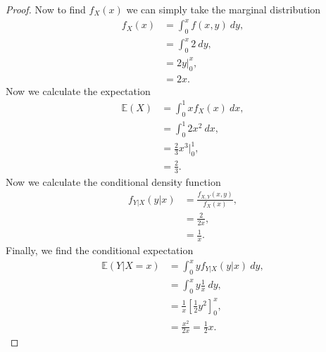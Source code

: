 \documentclass{article}
\newcommand{\E}[1]{\mathbb{E}(#1)}
\begin{document}
\begin{proof}
    Now to find $f_X(x)$ we can simply take the marginal distribution
    \begin{align*}
        f_X(x) & = \int_0^x f(x,y) \ dy, \\
               & = \int_0^x 2 \ dy,      \\
               & = 2y \big |_0^x,        \\
               & = 2x.
    \end{align*}
    Now we calculate the expectation
    \begin{align*}
        \E{X} & = \int_0^1 x f_X(x) \ dx,    \\
              & = \int_0^1 2x^2 \ dx,        \\
              & = \frac{2}{3}x^3 \big |_0^1, \\
              & = \frac{2}{3}.
    \end{align*}
    Now we calculate the conditional density function
    \begin{align*}
        f_{Y|X}(y|x) & = \frac{f_{X,Y}(x,y)}{f_X(x)}, \\
                     & = \frac{2}{2x},                \\
                     & = \frac{1}{x}.
    \end{align*}
    Finally, we find the conditional expectation
    \begin{align*}
        \E{Y|X=x} & = \int_0^x y f_{Y|X}(y|x) \ dy,                \\
                  & = \int_0^x y \frac{1}{x} \ dy,                 \\
                  & = \frac{1}{x} \left[\frac{1}{2}y^2\right]_0^x, \\
                  & = \frac{x^2}{2x} = \frac{1}{2}x.
    \end{align*}
\end{proof}
\end{document}
